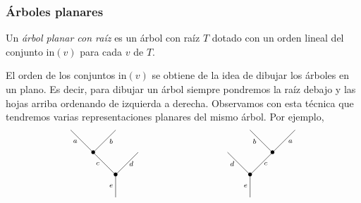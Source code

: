 \documentclass[../main.tex]{subfiles}
\begin{document}
\subsubsection{\'Arboles planares}
\begin{defi}
    Un \emph{\'arbol planar con ra\'iz} es un \'arbol con ra\'iz $T$ dotado con un orden lineal del conjunto in$(v)$ para cada $v$ de $T$.
\end{defi}
\begin{obs}
    El orden de los conjuntos in$(v)$ se obtiene de la idea de dibujar los \'arboles en un plano. Es decir, para dibujar un \'arbol siempre pondremos la ra\'iz debajo y las hojas arriba ordenando de izquierda a derecha.
    Observamos con esta t\'ecnica que tendremos varias representaciones planares del mismo \'arbol. Por ejemplo,
    \begin{equation}
        \xy
        <0.08cm, 0cm>:
        (0.0, 0.0)*{}="1"; %
        (0.0, 10.0)*=0{\bullet}="2"; %
        (-10.0, 20.0)*=0{\bullet}="3"; %
        (-20.0, 30.0)*{}="4"; %
        (0.0, 30.0)*{}="5"; %
        (10.0, 20.0)*{}="6"; %
        "1";"2" **\dir{-};
        "2";"3" **\dir{-};
        "3";"4" **\dir{-};
        "3";"5" **\dir{-};
        "2";"6" **\dir{-};
        (-2.0, 5.0)*=0{\scriptstyle e};
        (-8.0, 15.0)*=0{\scriptstyle c};
        (-18.0, 25.0)*=0{\scriptstyle a};
        (-2, 25.0)*=0{\scriptstyle b};
        (7.0, 15.0)*=0{\scriptstyle d};
        \endxy
        \xy
        <0.08cm, 0cm>:
        (-20, 0.0)*{}="1";
        (20, 0.0)*{}="2";
        \endxy
        \xy
        <0.08cm, 0cm>:
        (0.0, 0.0)*{}="1"; %
        (0.0, 10.0)*=0{\bullet}="2"; %
        (-10.0, 20.0)*{}="3"; %
        (10.0, 20.0)*=0{\bullet}="4"; %
        (0.0, 30.0)*{}="5"; %
        (20.0, 30.0)*{}="6"; %
        "1";"2" **\dir{-};
        "2";"3" **\dir{-};
        "2";"4" **\dir{-};
        "4";"5" **\dir{-};
        "4";"6" **\dir{-};
        (-2.0, 5.0)*=0{\scriptstyle e};
        (-8.0, 15.0)*=0{\scriptstyle d};
        (7.0, 15.0)*=0{\scriptstyle c};
        (2.0, 25.0)*=0{\scriptstyle b};
        (18, 25.0)*=0{\scriptstyle a};
        \endxy
    \end{equation}
\end{obs}
\end{document}
